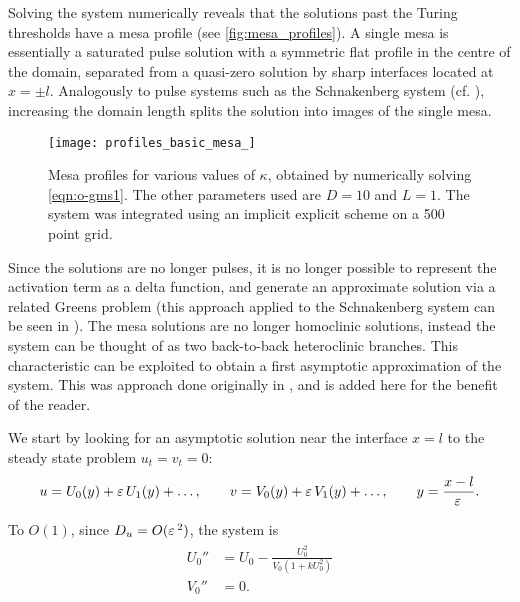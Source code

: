 Solving the system numerically reveals that the solutions past the Turing thresholds have a mesa profile (see \autoref{fig:mesa_profiles}). A single mesa is essentially a saturated pulse solution with a symmetric flat profile in the centre of the domain, separated from a quasi-zero solution by sharp interfaces located at $x=\pm l$. Analogously to pulse systems such as the Schnakenberg system (cf. \cite{schnakenberg_simple_1979}), increasing the domain length splits the solution into images of the single mesa.
% 
\begin{figure}[htb]
\begin{center}
\texttt{[image: profiles\_basic\_mesa\_]}
\caption{Mesa profiles for various values of $\kappa$, obtained by numerically solving \eqref{eqn:o-gms1}. The other parameters used are $D=10$ and $L=1$. The system was integrated using an implicit explicit scheme on a 500 point grid.}
\label{fig:mesa_profiles}
\end{center}
\end{figure}
% 
Since the solutions are no longer pulses, it is no longer possible to represent the activation term as a delta function, and generate an approximate solution via a related Greens problem (this approach applied to the Schnakenberg system can be seen in \cite{kolokolnikov_spot_2009}). The mesa solutions are no longer homoclinic solutions, instead the system can be thought of as two back-to-back heteroclinic branches. This characteristic can be exploited to obtain a first asymptotic approximation of the system. This was approach done originally in \cite{kolokolnikov_self_2007}, and is added here for the benefit of the reader.

We start by looking for an asymptotic solution near the interface $x=l$ to the steady state problem $u_t = v_t = 0$:
% 
$$
u=U_0(y) + \varepsilon\, U_1(y)+\ldots, \qquad v=V_0(y) + \varepsilon\, V_1(y)+\ldots, \qquad y=\frac{x-l}{\varepsilon\,}.
$$

To $O(1)$, since $D_u = O(\varepsilon\,^2)$, the system is
% 
\begin{equation*}
\label{eqn:order1}
\begin{split}
\begin{aligned}
	U_0'' &= U_0 - \frac{U_0^2}{V_0(1+kU_0^2)}\\
	V_0'' &= 0.
\end{aligned}
\end{split}
\end{equation*}

